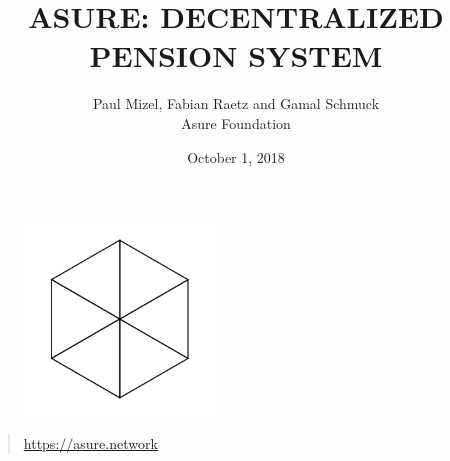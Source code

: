 \begin{figure}
    \centering
    \includegraphics[width=2.0in]{../img/logo.png}
\end{figure}

\title{ASURE: DECENTRALIZED PENSION SYSTEM}
\author{Paul Mizel, Fabian Raetz and Gamal Schmuck \\Asure Foundation}
\date{October 1, 2018}
\maketitle

\vskip 2.5in

\begin{quote}
	\centering
	\url{https://asure.network}
\end{quote}

\newpage 
